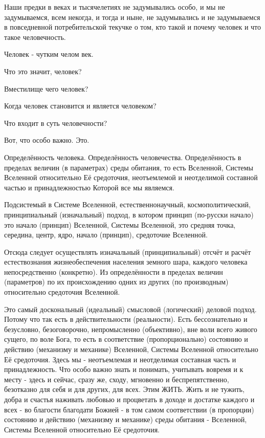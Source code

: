 \begin{itemize}
Наши предки в веках и тысячелетиях не задумывались особо, и мы не задумываемся,
всем некогда, и тогда и ныне, не задумывались и не задумываемся в повседневной
потребительской текучке о том, кто такой и почему человек и что такое
человечность.

Человек - чутким челом век.

Что это значит, человек?

Вместилище чего человек?

Когда человек становится и является человеком?

Что входит в суть человечности?

Вот, что особо важно. Это.

Определённость человека. Определённость человечества. Определённость в пределах
величин (в параметрах) среды обитания, то есть Вселенной, Системы Вселенной
относительно Её средоточия, неотъемлемой и неотделимой составной частью и
принадлежностью Которой все мы являемся.

Подсистемый в Системе Вселенной, естественнонаучный, космополитический,
принципиальный (изначальный) подход, в котором принцип (по-русски начало) это
начало (принцип) Вселенной, Системы Вселенной, это средняя точка, середина,
центр, ядро, начало (принцип), средоточие Вселенной.

Отсюда следует осуществлять изначальный (принципиальный) отсчёт и расчёт
естествознания жизнеобеспечения населения земного шара, каждого человека
непосредственно (конкретно). Из определённости в пределах величин (параметров)
по их происхождению одних из других (по производным) относительно средоточия
Вселенной.

Это самый доскональный (идеальный) смысловой (логический) деловой подход.
Потому что так есть в действительности (реальности). Есть бессознательно и
безусловно, безоговорочно, непромысленно (объективно), вне воли всего живого
сущего, по воле Бога, то есть в соответствие (пропорционально) состоянию и
действию (механизму и механике) Вселенной, Системы Вселенной относительно Её
средоточия. Здесь мы - неотъемлемая и неотделимая составная часть и
принадлежность. Что особо важно знать и понимать, учитывать вовремя и к месту -
здесь и сейчас, сразу же, сходу, мгновенно и беспрепятственно, безотказно для
себя и для других, для всех. Этим ЖИТЬ. Жить и не тужить, добра и счастья
наживать любовью и процветать в доходе и достатке каждого и всех - во благости
благодати Божией - в том самом соответствии (в пропорции) состоянию и действию
(механизму и механике) среды обитания - Вселенной, Системы Вселенной
относительно Её средоточия.


\end{itemize}
